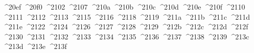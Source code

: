 {  ^^^^20ef%
  ^^^^20f0%
  ^^^^2102%
  ^^^^2107%
  ^^^^210a%
  ^^^^210b%
  ^^^^210c%
  ^^^^210d%
  ^^^^210e%
  ^^^^210f%
  ^^^^2110%
  ^^^^2111%
  ^^^^2112%
  ^^^^2113%
  ^^^^2115%
  ^^^^2116%
  ^^^^2118%
  ^^^^2119%
  ^^^^211a%
  ^^^^211b%
  ^^^^211c%
  ^^^^211d%
  ^^^^211e%
  ^^^^2122%
  ^^^^2124%
  ^^^^2126%
  ^^^^2127%
  ^^^^2128%
  ^^^^2129%
  ^^^^212b%
  ^^^^212c%
  ^^^^212d%
  ^^^^212f%
  ^^^^2130%
  ^^^^2131%
  ^^^^2132%
  ^^^^2133%
  ^^^^2134%
  ^^^^2135%
  ^^^^2136%
  ^^^^2137%
  ^^^^2138%
  ^^^^2139%
  ^^^^213c%
  ^^^^213d%
  ^^^^213e%
  ^^^^213f%
}
